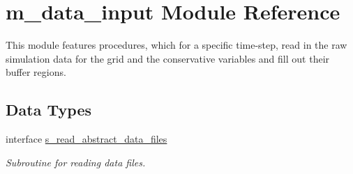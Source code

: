 \hypertarget{namespacem__data__input}{}\section{m\+\_\+data\+\_\+input Module Reference}
\label{namespacem__data__input}


This module features procedures, which for a specific time-\/step, read in the raw simulation data for the grid and the conservative variables and fill out their buffer regions.  


\subsection*{Data Types}
\begin{DoxyCompactItemize}
\item 
interface \hyperlink{interfacem__data__input_1_1s__read__abstract__data__files}{s\+\_\+read\+\_\+abstract\+\_\+data\+\_\+files}
\begin{DoxyCompactList}\small\item\em Subroutine for reading data files. \end{DoxyCompactList}\end{DoxyCompactItemize}
